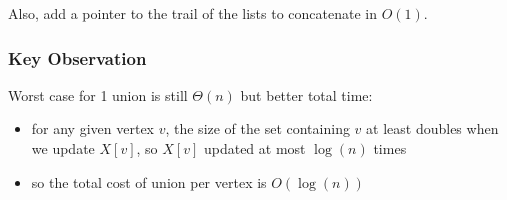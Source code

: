 \documentclass[11pt]{article}
\begin{document}
Also, add a pointer to the trail of the lists to concatenate in \(O(1)\).
\subsubsection{Key Observation}
\label{sec:orgaff035d}
Worst case for 1 union is still \(\Theta(n)\) but better total time:
\begin{itemize}
\item for any given vertex \(v\), the size of the set containing \(v\) at least doubles when
we update \(X[v]\), so \(X[v]\) updated at most \(\log(n)\) times
\item so the total cost of union per vertex is \(O(\log(n))\)
\end{itemize}
\end{document}
